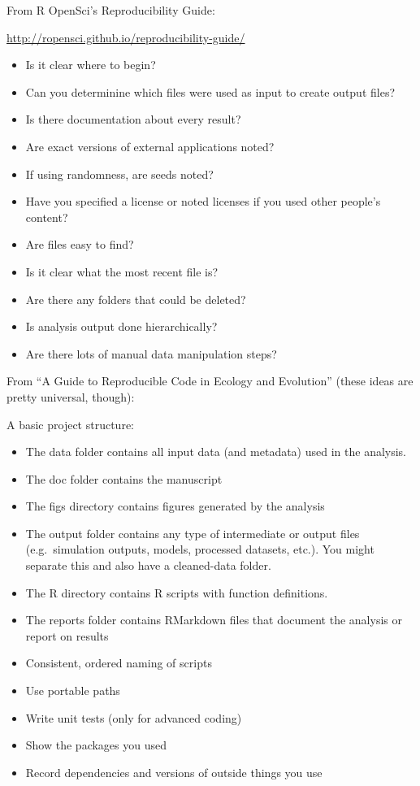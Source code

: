 \documentclass[12pt]{article}
\providecommand{\tightlist}{%
  \setlength{\itemsep}{0pt}\setlength{\parskip}{0pt}}
\begin{document}
\citet{kitzes2017practice}

From R OpenSci's Reproducibility Guide:

\url{http://ropensci.github.io/reproducibility-guide/}

\begin{itemize}
\tightlist
\item
  Is it clear where to begin?
\item
  Can you determinine which files were used as input to create output
  files?
\item
  Is there documentation about every result?
\item
  Are exact versions of external applications noted?
\item
  If using randomness, are seeds noted?
\item
  Have you specified a license or noted licenses if you used other
  people's content?
\item
  Are files easy to find?
\item
  Is it clear what the most recent file is?
\item
  Are there any folders that could be deleted?
\item
  Is analysis output done hierarchically?
\item
  Are there lots of manual data manipulation steps?
\end{itemize}

From ``A Guide to Reproducible Code in Ecology and Evolution'' (these
ideas are pretty universal, though):

A basic project structure:

\begin{itemize}
\item
  The data folder contains all input data (and metadata) used in the
  analysis.
\item
  The doc folder contains the manuscript
\item
  The figs directory contains figures generated by the analysis
\item
  The output folder contains any type of intermediate or output files
  (e.g.~simulation outputs, models, processed datasets, etc.). You might
  separate this and also have a cleaned-data folder.
\item
  The R directory contains R scripts with function definitions.
\item
  The reports folder contains RMarkdown files that document the analysis
  or report on results
\item
  Consistent, ordered naming of scripts
\item
  Use portable paths
\item
  Write unit tests (only for advanced coding)
\item
  Show the packages you used
\item
  Record dependencies and versions of outside things you use
\end{itemize}
\end{document}
